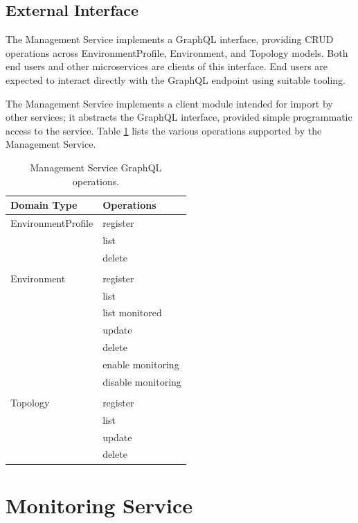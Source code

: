 \subsection{External Interface} \label{management_service_external_interfaces}

The Management Service implements a GraphQL interface, providing CRUD operations across EnvironmentProfile, Environment, and Topology models. Both end users and other microservices are clients of this interface. End users are expected to interact directly with the GraphQL endpoint using suitable tooling. 

The Management Service implements a client module intended for import by other services; it abstracts the GraphQL interface, provided simple programmatic access to the service. Table \ref{mgmt_svc_graphql_operations} lists the various operations supported by the Management Service.

\vspace{10 mm}

\begin{table}[H]
	\centering
	\begin{tabular}{ |p{4cm}||p{4cm}| }
		\hline
		Domain Type& Operations \\
		\hline
		EnvironmentProfile   & register   \\
		& list   \\
		& delete   \\
		&     \\
		Environment &register \\
		&list \\
		&list monitored \\
		&update \\
		&delete \\
		&enable monitoring \\
		&disable monitoring \\
		&     \\
		Topology & register \\
		& list \\
		& update \\
		& delete \\
		\hline
		\end{tabular}
	\caption{Management Service GraphQL operations.}
		\label{mgmt_svc_graphql_operations}
\end{table}

\newpage
 
\section{Monitoring Service}

